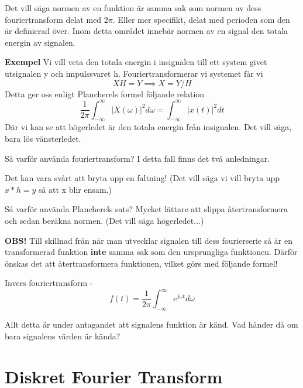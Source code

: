 \documentclass{article}
\begin{document}
Det vill säga normen av en funktion är samma sak som normen av dess
fouriertransform delat med $2 \pi$. Eller mer specifikt, delat med perioden
som den är definierad över. Inom detta området innebär normen av en signal den
totala energin av signalen.

\textbf{Exempel}
Vi vill veta den totala energin i insignalen till ett system givet utsignalen y
och impulssvaret h. Fouriertransformerar vi systemet får vi
$$XH = Y \implies X = Y/H$$
Detta ger oss enligt Plancherels formel följande relation
$$\frac{1}{2 \pi} \int_{-\infty}^{\infty} |X(\omega)|^2 d \omega =
\int_{-\infty}^{\infty} |x(t)|^2 d t$$
Där vi kan se att högerledet är den totala energin från insignalen.
Det vill säga, bara lös vänsterledet.

Så varför använda fouriertransform? I detta fall finns det två anledningar.

Det kan vara svårt att bryta upp en faltning!
(Det vill säga vi vill bryta upp $x*h=y$ så att x blir ensam.)

Så varför använda Plancherels sats? Mycket lättare att slippa återtransformera
och sedan beräkna normen. (Det vill säga högerledet...)

\textbf{OBS!} Till skillnad från när man utvecklar signalen till dess
fourierserie så är en transformerad funktion \textbf{inte} samma sak
som den ursprungliga funktionen.
Därför önskas det att återtransformera funktionen, vilket görs med följande formel!

Invers fouriertransform -
$$f(t) = \frac{1}{2 \pi} \int_{-\infty}^{\infty}  e^{j \omega t} d\omega$$

Allt detta är under antagandet att signalens funktion är känd.
Vad händer då om bara signalens värden är kända?

\section{Diskret Fourier Transform}
\end{document}
